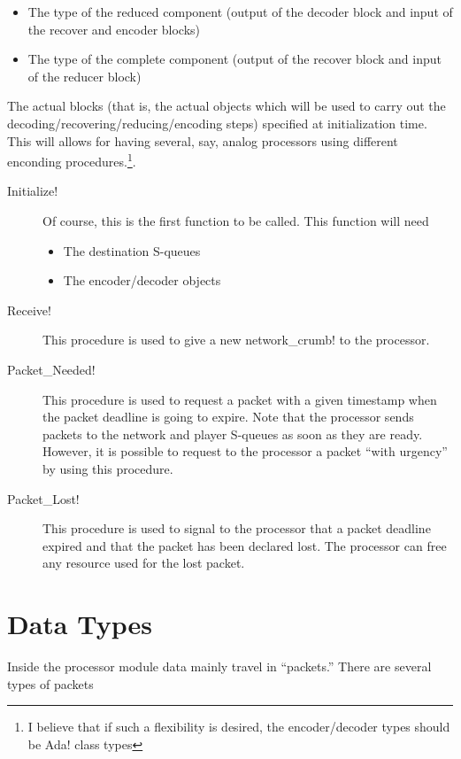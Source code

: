 \documentclass{medusabook}
\begin{document}
\begin{itemize}
  \item
    The type of the reduced component (output of the decoder block and
    input of the recover and encoder blocks)
  \item
    The type of the complete component (output of the recover block
    and input of the reducer block)
\end{itemize}
%
The actual blocks (that is, the actual objects which will be used to
carry out the decoding/recovering/reducing/encoding steps) 
specified at initialization time.  This will allows for having
several, say, analog processors using different enconding
procedures.\footnote{I believe that if such a flexibility is desired,
  the encoder/decoder types should be \ttt Ada! class types}.

\begin{description}
\item[\ttt Initialize!] Of course, this is the first function to be
  called.  This function will need 
  \begin{itemize}
    \item The destination S-queues
    \item The encoder/decoder objects
  \end{itemize}
\item[\ttt Receive!] This procedure is used to give a new \ttt
  network\_crumb! to the processor.
\item[\ttt Packet\_Needed!] This procedure is used to request a packet
  with a given timestamp when the packet deadline is going to expire.
  Note that the processor sends packets to the network and player
  S-queues as soon as they are ready.  However, it is possible to
  request to the processor a packet ``with urgency'' by using this
  procedure.
\item[\ttt Packet\_Lost!] This procedure is used to signal to the
  processor that a packet deadline expired and that the packet has
  been declared lost.  The processor can free any resource used for
  the lost packet.
\end{description}
%

\chapter{Data Types}
\label{chap:1;dsp_book}

Inside the processor module data mainly travel in ``packets.''  There
are several types of packets
\end{document}
